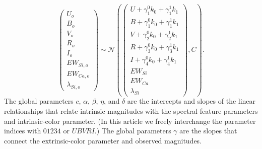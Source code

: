 \documentclass{aastex61}   	%
\begin{document}
\begin{equation}
\begin{pmatrix}
U_o\\B_o\\ V_o\\R_o\\I_o\\EW_{Si, o}\\ EW_{Ca, o} \\ \lambda_{Si, o}
\end{pmatrix}
\sim \mathcal{N}
\left(
\begin{pmatrix}
U +\gamma^0_{1} k_0 +\gamma^1_{1} k_1 \\B +\gamma^0_{1} k_0 +\gamma^1_{1} k_1 \\
V+\gamma^0_{2} k_0+\gamma^1_{2} k_1\\R+\gamma^0_{3} k_0 + \gamma^1_{3} k_1\\I+\gamma^0_{4} k_0+\gamma^1_{4} k_1\\
EW_{Si}\\ EW_{Ca} \\ \lambda_{Si}
\end{pmatrix}
,C
\right).
\label{dust:eqn}
\end{equation}
The global parameters $c$, $\alpha$, $\beta$, $\eta$, and $\delta$  are the intercepts and slopes of the linear relationships that
relate intrinsic magnitudes with the spectral-feature parameters and intrinsic-color parameter.
(In this article we freely interchange the parameter indices with  $01234$ or $UBVRI$.)
The global parameters $\gamma$ are the slopes that connect the extrinsic-color
parameter and observed magnitudes.
\end{document}
